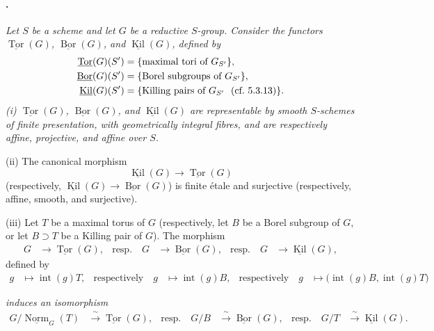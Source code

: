 \paragraph{.}
{\itshape Let \(S\) be a scheme and let \(G\) be a reductive
\(S\)-group. Consider the functors
\(\underline{\operatorname{Tor}}(G)\),
\(\underline{\operatorname{Bor}}(G)\), and
\(\underline{\operatorname{Kil}}(G)\), defined by
\[
\begin{aligned}
  \underline{\operatorname{Tor}}(G)(S')
  &=
  \{\text{maximal tori of \(G_{S'}\)}\},\\
  \underline{\operatorname{Bor}}(G)(S')
  &=
  \{\text{Borel subgroups of \(G_{S'}\)}\},\\
  \underline{\operatorname{Kil}}(G)(S')
  &=
  \{\text{Killing pairs of \(G_{S'}\)
  \textup{ (cf.\ 5.3.13)}}\}.
\end{aligned}
\]
\textup{(i)}
\(\underline{\operatorname{Tor}}(G)\),
\(\underline{\operatorname{Bor}}(G)\), and
\(\underline{\operatorname{Kil}}(G)\) are representable by smooth
\(S\)-schemes of finite presentation, with geometrically integral
fibres, and are respectively affine, projective, and affine over
\(S\).

\textup{(ii)}
The canonical morphism
\[
  \underline{\operatorname{Kil}}(G)
  \longrightarrow
  \underline{\operatorname{Tor}}(G)
\]
\textup{(respectively,
\(\underline{\operatorname{Kil}}(G)\to
\underline{\operatorname{Bor}}(G)\))}
is finite étale and surjective
\textup{(respectively, affine, smooth, and surjective)}.

\textup{(iii)}
Let \(T\) be a maximal torus of \(G\)
\textup{(respectively, let \(B\) be a Borel subgroup of \(G\), or
let \(B\supset T\) be a Killing pair of \(G\))}. The morphism
\[
\begin{aligned}
  G&\longrightarrow\underline{\operatorname{Tor}}(G),
  &\text{resp.}\quad
  G&\longrightarrow\underline{\operatorname{Bor}}(G),
  &\text{resp.}\quad
  G&\longrightarrow\underline{\operatorname{Kil}}(G),
\end{aligned}
\]
defined by
\[
\begin{aligned}
  g&\longmapsto\operatorname{int}(g)T,
  &\text{respectively}\quad
  g&\longmapsto\operatorname{int}(g)B,
  &\text{respectively}\quad
  g&\longmapsto
  \bigl(\operatorname{int}(g)B,\operatorname{int}(g)T\bigr)
\end{aligned}
\]}

{\itshape induces an isomorphism}
\[
\begin{aligned}
  G/\underline{\operatorname{Norm}}_G(T)
  &\xrightarrow{\;\sim\;}
  \underline{\operatorname{Tor}}(G),
  &\text{resp.}\quad
  G/B
  &\xrightarrow{\;\sim\;}
  \underline{\operatorname{Bor}}(G),
  &\text{resp.}\quad
  G/T
  &\xrightarrow{\;\sim\;}
  \underline{\operatorname{Kil}}(G).
\end{aligned}
\]

